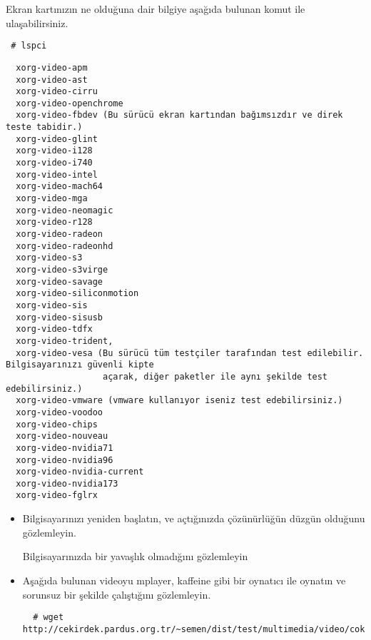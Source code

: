\documentclass[a4paper,10pt]{article}
\begin{document}
\begin{enumerate}
Ekran kartınızın ne olduğuna dair bilgiye aşağıda bulunan komut ile ulaşabilirsiniz.
\begin{verbatim}
 # lspci
\end{verbatim}

\begin{verbatim}
  xorg-video-apm 
  xorg-video-ast
  xorg-video-cirru
  xorg-video-openchrome
  xorg-video-fbdev (Bu sürücü ekran kartından bağımsızdır ve direk teste tabidir.)
  xorg-video-glint
  xorg-video-i128
  xorg-video-i740
  xorg-video-intel
  xorg-video-mach64
  xorg-video-mga
  xorg-video-neomagic
  xorg-video-r128
  xorg-video-radeon
  xorg-video-radeonhd
  xorg-video-s3
  xorg-video-s3virge
  xorg-video-savage
  xorg-video-siliconmotion
  xorg-video-sis
  xorg-video-sisusb
  xorg-video-tdfx
  xorg-video-trident,
  xorg-video-vesa (Bu sürücü tüm testçiler tarafından test edilebilir. Bilgisayarınızı güvenli kipte
                   açarak, diğer paketler ile aynı şekilde test edebilirsiniz.)
  xorg-video-vmware (vmware kullanıyor iseniz test edebilirsiniz.)
  xorg-video-voodoo
  xorg-video-chips
  xorg-video-nouveau
  xorg-video-nvidia71
  xorg-video-nvidia96
  xorg-video-nvidia-current
  xorg-video-nvidia173
  xorg-video-fglrx
\end{verbatim}

\begin{itemize}
  \item Bilgisayarınızı yeniden başlatın, ve açtığınızda çözünürlüğün düzgün olduğunu gözlemleyin.

  Bilgisayarınızda bir yavaşlık olmadığını gözlemleyin
  \item Aşağıda bulunan videoyu mplayer, kaffeine gibi bir oynatıcı ile oynatın ve sorunsuz bir şekilde çalıştığını gözlemleyin.
  \begin{verbatim}
  # wget http://cekirdek.pardus.org.tr/~semen/dist/test/multimedia/video/cokluortam/DVD.mpg
  \end{verbatim}
\end{itemize}

\end{enumerate}
\end{document}
